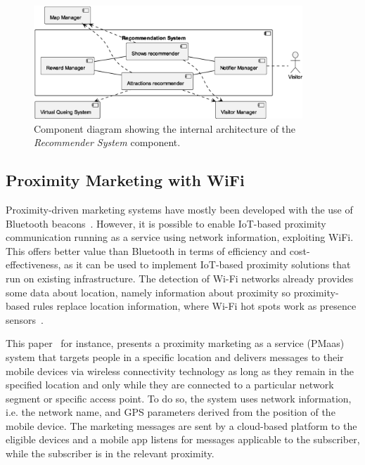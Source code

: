 \begin{figure}[H]
	\centering
	\includegraphics[width=0.9\textwidth]{img/recommender.eps}
	\caption{Component diagram showing the internal architecture of the \textit{Recommender System} component.
	}
	\label{fig:recommender-arch}
\end{figure}

\subsection{Proximity Marketing with WiFi}\label{subsec:technologies-for-proximity-marketing}
Proximity-driven marketing systems have mostly been developed with the use of Bluetooth beacons~\cite{mndebele2017iot}.
However, it is possible to enable IoT-based proximity communication running as a service using network information, exploiting WiFi.
This offers better value than Bluetooth in terms of efficiency and cost-effectiveness, as it can be used to implement IoT-based proximity solutions that run on existing infrastructure.
The detection of Wi-Fi networks already provides some data about location, namely information about proximity so
proximity-based rules replace location information, where Wi-Fi hot spots work as presence sensors~\cite{dmitry2013network}.

This paper~\cite{mndebele2017iot} for instance, presents a proximity marketing as a service (PMaas) system that targets people in a specific location and delivers messages to their mobile devices via wireless connectivity technology as long as they remain in the specified location and only while they are connected to a particular network segment or specific access point.
To do so, the system uses network information, i.e. the network name, and GPS parameters derived from the position of the mobile device.
The marketing messages are sent by a cloud-based platform to the eligible devices and a mobile app listens for messages
applicable to the subscriber, while the subscriber is in the relevant proximity.


